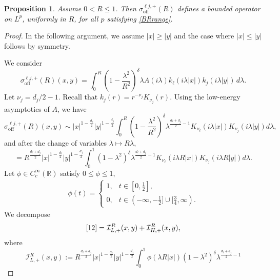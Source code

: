 \documentclass[12pt]{amsart}
\newcommand\R{\mathbb{R}}
\newtheorem{proposition}[theorem]{Proposition}
\begin{document}
\begin{proposition}\label{prop:smallR}
Assume $0<R\le 1$. Then $\sigma_{\mathrm{off}}^{\ell j,+}(R)$ defines a bounded operator on $L^p$, uniformly in $R$, for all $p$ satisfying \eqref{BRrange}.
\end{proposition}



\begin{proof}
In the following argument, we assume \(|x|\ge |y|\) and the case where $|x|\le |y|$ follows by symmetry. 

We consider
\begin{equation*}
\sigma_{\mathrm{off}}^{\ell j,+}(R)(x,y)
=
\int_0^R
\left(1-\frac{\lambda^2}{R^2}\right)^\delta
\lambda A(i\lambda)k_\ell(i\lambda|x|)k_j(i\lambda|y|)\, d\lambda.
\tag{10}
\end{equation*}
Let $\nu_j = d_j/2-1$. Recall that $k_j(r) = r^{-\nu_j}K_{\nu_j}(r)$. Using the low-energy asymptotics of $A$, we have
\begin{equation*}
\sigma_{\mathrm{off}}^{\ell j,+}(R)(x,y)
\sim
|x|^{1-\frac{d_\ell}{2}}|y|^{1-\frac{d_j}{2}}
\int_0^R
\left(1-\frac{\lambda^2}{R^2}\right)^\delta
\lambda^{\frac{d_\ell+d_j}{2}-1}
K_{\nu_\ell}(i\lambda|x|)K_{\nu_j}(i\lambda|y|) d\lambda,
\end{equation*}
and after the change of variables $\lambda\mapsto R\lambda$,
\begin{equation}\label{12}
=
R^{\frac{d_\ell+d_j}{2}}
|x|^{1-\frac{d_\ell}{2}}|y|^{1-\frac{d_j}{2}}
\int_0^1
(1-\lambda^2)^\delta
\lambda^{\frac{d_\ell+d_j}{2}-1}
K_{\nu_\ell}(i\lambda R|x|)K_{\nu_j}(i\lambda R|y|) d\lambda.
\end{equation}
Let $\phi\in C_c^\infty(\R)$ satisfy $0\le \phi\le 1$, 
\begin{align*}
    \phi(t) = \begin{cases}
        1, & t\in [0,\frac{1}{2}],\\
        0, & t\in (-\infty, -\frac{1}{2}] \cup [\frac{3}{4}, \infty).
\end{cases}
\end{align*}
We decompose
\begin{equation*}
    \eqref{12} = \mathcal{I}_{L,+}^R(x,y)+\mathcal{I}_{H,+}^R(x,y),
\end{equation*}
where
\begin{equation*}
    \mathcal{I}_{L,+}^R(x,y)
:=
R^{\frac{d_\ell+d_j}{2}}
|x|^{1-\frac{d_\ell}{2}}|y|^{1-\frac{d_j}{2}}
\int_0^1
\phi(\lambda R|x|)(1-\lambda^2)^\delta
\lambda^{\frac{d_\ell+d_j}{2}-1}

\end{equation*}
\end{proof}
\end{document}
